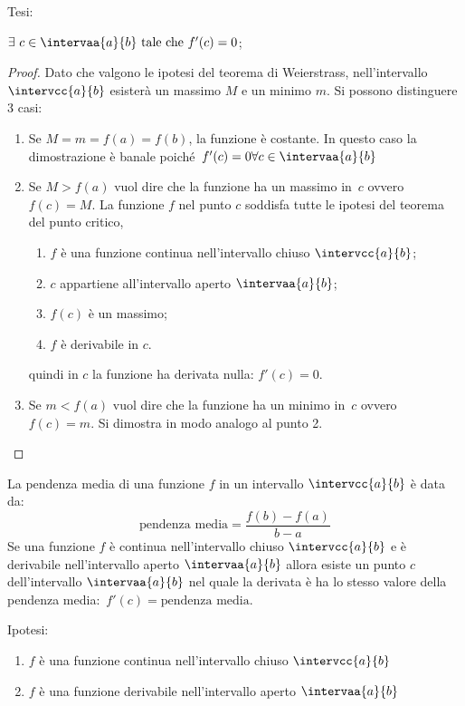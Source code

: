 \noindent Tesi: 

\(\exists~c \in \intervaa{a}{b} \text{ tale che } f'(c)=0\);

\begin{proof}
Dato che valgono le ipotesi del teorema di Weierstrass, 
nell'intervallo \(\intervcc{a}{b}\) 
esisterà un massimo \(M\) e un minimo \(m\).
Si possono distinguere 3 casi:
\begin{enumerate} %
 \item Se \(M = m = f(a) = f(b)\), la funzione è costante. 
 In questo caso la dimostrazione è banale 
 poiché~\(f'(c)=0 \forall c \in \intervaa{a}{b}\)
 \item Se \(M > f(a)\) vuol dire che la funzione ha un massimo 
 in~\(c\) ovvero~\(f(c)=M\). 
 La funzione \(f\) nel punto \(c\) soddisfa tutte le ipotesi del teorema 
 del punto critico, 
\begin{enumerate}[noitemsep]
 \item \(f\) è una funzione continua nell'intervallo chiuso \(\intervcc{a}{b}\);
 \item \(c\) appartiene all'intervallo aperto \(\intervaa{a}{b}\);
 \item \(f(c)\) è un massimo;
 \item \(f\) è derivabile in \(c\).
\end{enumerate}
 quindi in \(c\) la funzione ha derivata nulla: \(f'(c)=0\).
 \item Se \(m < f(a)\) vuol dire che la funzione ha un minimo 
 in~\(c\) ovvero~\(f(c)=m\).
 Si dimostra in modo analogo al punto 2.
\end{enumerate}
\end{proof}

\begin{teorema}
La pendenza media di una funzione \(f\) in un intervallo 
\(\intervcc{a}{b}\) è data da:
\[\text{pendenza media} = \frac{f(b)-f(a)}{b-a}\]
Se una funzione \(f\) è continua nell'intervallo chiuso \(\intervcc{a}{b}\) e
è derivabile nell'intervallo aperto \(\intervaa{a}{b}\) allora
esiste un punto \(c\) dell'intervallo \(\intervaa{a}{b}\) nel quale 
la derivata è ha lo stesso valore della 
pendenza media:~\(f'(c)=\text{pendenza media}\).
\end{teorema}

\noindent Ipotesi:
\begin{enumerate}[nosep]
 \item \(f\) è una funzione continua 
 nell'intervallo chiuso \(\intervcc{a}{b}\)
 \item \(f\) è una funzione derivabile 
 nell'intervallo aperto \(\intervaa{a}{b}\)
\end{enumerate}

